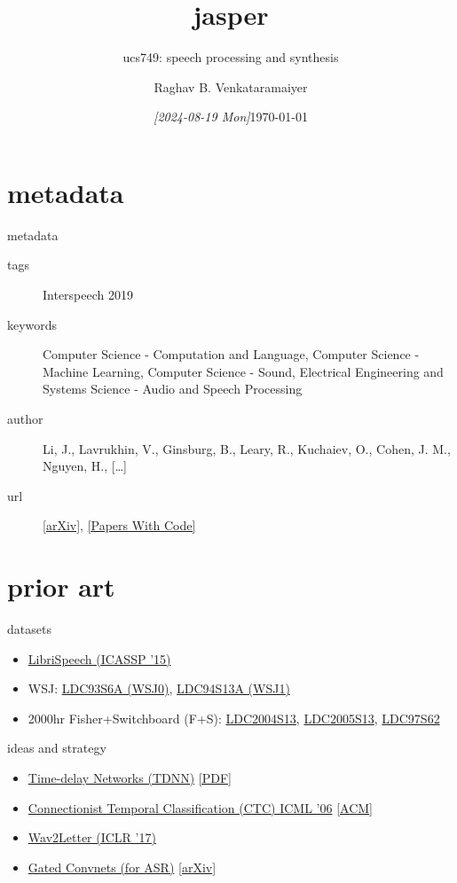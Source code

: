 \documentclass[aspectratio=169,xcolor={dvipsnames,svgnames}]{beamer}
\date{\textit{[2024-08-19 Mon]}}
\title{jasper}
\subtitle{ucs749: speech processing and synthesis}
\author{%
\normalsize Raghav B. Venkataramaiyer
}
\institute{%
CSED TIET Patiala India.
}
\date{\scriptsize \today}
\begin{document}
\maketitle

\section{metadata}
\label{sec:org38583d8}

\begin{frame}[label={sec:orgc325e05}]{metadata}
\begin{description}
\item[{tags}] Interspeech 2019
\item[{keywords}] Computer Science - Computation and
Language, Computer Science - Machine Learning,
Computer Science - Sound, Electrical Engineering and
Systems Science - Audio and Speech Processing
\item[{author}] Li, J., Lavrukhin, V., Ginsburg, B., Leary,
R., Kuchaiev, O., Cohen, J. M., Nguyen, H., […]
\item[{url}] \href{http://arxiv.org/abs/1904.03288}{[arXiv]​}, \href{https://paperswithcode.com/paper/jasper-an-end-to-end-convolutional-neural\#code}{[Papers With Code]​}
\end{description}
\end{frame}

\section{prior art}
\label{sec:prior-art}
\begin{frame}[label={sec:datasets}]{datasets}
\begin{itemize}
\item \href{https://doi.org/10.1109/ICASSP.2015.7178964}{LibriSpeech (ICASSP ’15)}
\item WSJ: \href{https://doi.org/10.35111/ewkm-cg47}{LDC93S6A (WSJ0)}, \href{https://doi.org/10.35111/q7sb-vv12}{LDC94S13A (WSJ1)}
\item 2000hr Fisher+Switchboard (F+S): \href{https://doi.org/10.35111/da4a-se30}{LDC2004S13},
\href{https://doi.org/10.35111/dz78-gx84}{LDC2005S13}, \href{https://doi.org/10.35111/sw3h-rw02}{LDC97S62}
\end{itemize}
\end{frame}


\begin{frame}[label={sec:ideas-and-strategy}]{ideas and strategy}
\begin{itemize}
\item \href{../time-delay-networks/}{Time-delay Networks (TDNN)} \href{https://www.cs.toronto.edu/\~hinton/absps/langTDNN.pdf}{[PDF}]
\item \href{../ctc/}{Connectionist Temporal Classification (CTC) ICML ’06}
\href{https://dl.acm.org/doi/abs/10.1145/1143844.1143891}{[ACM}]
\item \href{https://arxiv.org/abs/1609.03193}{Wav2Letter (ICLR '17)}
\item \hyperlink{sec:gated-activation-unit}{Gated Convnets (for ASR)} \href{https://arxiv.org/abs/1712.09444}{[arXiv}]
\end{itemize}
\end{frame}
\end{document}
